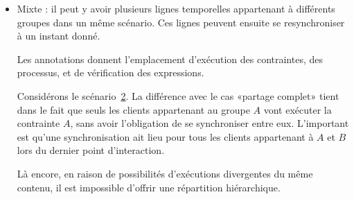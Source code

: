 \documentclass{article}
\newcommand\trigger{point d'interaction\xspace}
\begin{document}
\begin{itemize}
    Cela implique que les annotations de groupes assignés aux objets du scénario sont ignorés, récursivement : puisque chaque exécution va avoir des temps différents par conception, il ne peut pas vraiment y avoir de synchronisation.
    La seule politique d'exécution qui pourrait faire sens serait que le premier client à valider un \trigger dans un scénario non partagé avertirait les clients suivants.
    
    Ce cas est notamment utile pour avoir des sous-scénarios dont plusieurs participants à une installation artistique peuvent faire l'expérience en même temps, tout en gardant une trame générale de plus haut niveau. 
    Typiquement, on peut imaginer ce cas pour une application mobile.
    
    \begin{figure}[h]
        \centering
        \begin{tikzpicture}
        
        \end{tikzpicture}
        \label{scenar.general}
    \end{figure}

    \item Mixte : il peut y avoir plusieurs lignes temporelles appartenant à différents groupes dans un même scénario. Ces lignes peuvent ensuite se resynchroniser à un instant donné. 
    
    Les annotations donnent l'emplacement d'exécution des contraintes, des processus, et de vérification des expressions. 
    
    Considérons le scénario~\ref{scenar.twobranches}. 
    La différence avec le cas «partage complet» tient dans le fait que seuls les clients appartenant au groupe $A$ vont exécuter la contrainte $A$, sans avoir l'obligation de se synchroniser entre eux. 
    L'important est qu'une synchronisation ait lieu pour tous les clients appartenant à $A$ et $B$ lors du dernier \trigger.
    
    Là encore, en raison de possibilités d'exécutions divergentes du même contenu, il est impossible d'offrir une répartition hiérarchique.
    
    \begin{figure}[h]
        \centering
        \begin{tikzpicture}
        
        \end{tikzpicture}
        \label{scenar.twobranches}
    \end{figure}
    
\end{itemize}
\end{document}
